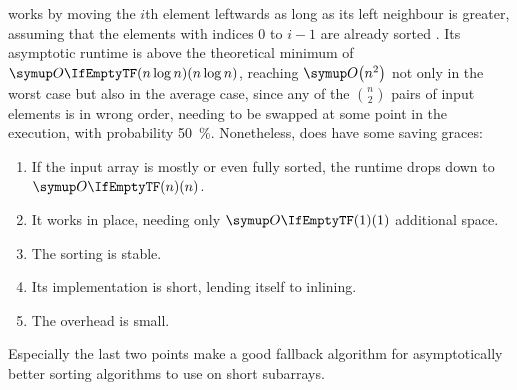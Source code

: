 \section{\texorpdfstring{\IS{}}{InsertionSort}}
\label{sec:tasklet:insertion}

\IS{} works by moving the \(i\)th element leftwards as long as its left neighbour is greater, assuming that the elements with indices \(0\) to \(i - 1\) are already sorted \cites[83]{maurer1974datenstrukturen}[Chapter~2.2.1]{wirth1975algorithmen}.
Its asymptotic runtime is above the theoretical minimum of \(\bigoh{n \log n}\), reaching \(\bigoh*{n^2}\) not only in the worst case but also in the average case, since any of the \(\binom{n}{2}\) pairs of input elements is in wrong order, needing to be swapped at some point in the execution, with probability \qty{50}{\percent}.
Nonetheless, \IS{} does have some saving graces:
\begin{enumerate}
	\item
	If the input array is mostly or even fully sorted, the runtime drops down to \(\bigoh{n}\).

	\item
	It works in place, needing only \(\bigoh{1}\) additional space.

	\item
	The sorting is stable.

	\item
	Its implementation is short, lending itself to inlining.

	\item
	The overhead is small.
\end{enumerate}
Especially the last two points make \IS{} a good fallback algorithm for asymptotically better sorting algorithms to use on short subarrays.






